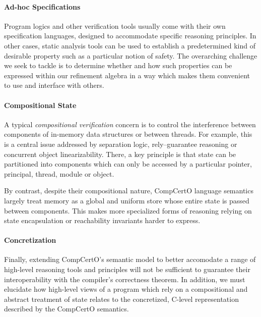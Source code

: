 \paragraph{Ad-hoc Specifications} %

Program logics and other verification tools
usually come with their own specification languages,
designed to accommodate specific reasoning principles.
In other cases,
static analysis tools
can be used to establish a predetermined kind of desirable property
such as a particular notion of safety.
%
The overarching challenge we seek to tackle
is to determine whether and how such properties
can be expressed within our refinement algebra
in a way which makes them convenient to use and interface
with others.


\paragraph{Compositional State} %

A typical \emph{compositional verification} concern is to
control the interference between
components of in-memory data structures
or between threads.
For example,
this is a central issue addressed by
separation logic,
rely--guarantee reasoning or
concurrent object linearizability.
There,
a key principle is that
state can be partitioned into components
which can only be accessed by a particular
pointer, principal, thread, module or object.

By contrast,
despite their compositional nature,
CompCertO language semantics
largely treat memory as a global and uniform store
whose entire state is passed between components.
This makes more specialized forms of reasoning
relying on state encapsulation or reachability invariants
harder to express.


\paragraph{Concretization} %

Finally,
extending CompCertO's semantic model
to better accomodate a range of high-level
reasoning tools and principles
will not be sufficient to guarantee their interoperability
with the compiler's correctness theorem.
In addition,
we must elucidate how high-level views of a program
which rely on a compositional and abstract treatment of state
relates to the concretized, C-level representation
described by the CompCertO semantics.

